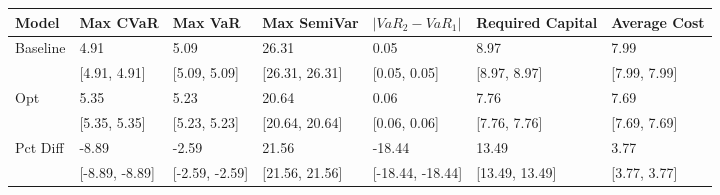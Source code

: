 \begin{tabular}{lllllll}
\toprule
   Model &       Max CVaR &        Max VaR &    Max SemiVar & $|VaR_2 - VaR_1|$ & Required Capital & Average Cost \\
\midrule
Baseline &           4.91 &           5.09 &          26.31 &              0.05 &             8.97 &         7.99 \\
         &   [4.91, 4.91] &   [5.09, 5.09] & [26.31, 26.31] &      [0.05, 0.05] &     [8.97, 8.97] & [7.99, 7.99] \\
     Opt &           5.35 &           5.23 &          20.64 &              0.06 &             7.76 &         7.69 \\
         &   [5.35, 5.35] &   [5.23, 5.23] & [20.64, 20.64] &      [0.06, 0.06] &     [7.76, 7.76] & [7.69, 7.69] \\
Pct Diff &          -8.89 &          -2.59 &          21.56 &            -18.44 &            13.49 &         3.77 \\
         & [-8.89, -8.89] & [-2.59, -2.59] & [21.56, 21.56] &  [-18.44, -18.44] &   [13.49, 13.49] & [3.77, 3.77] \\
\bottomrule
\end{tabular}

